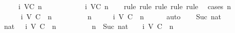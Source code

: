 \begin{isabellebody}
\ \ {\isachardoublequoteopen}{\isasymforall}\ {\isasymsigma}\ {\isasymsigma}{\isacharprime}{\isachardot}\ {\isasymsigma}{\isacharprime}\ {\isasymin}\ {\isasymSigma}i\ {\isacharparenleft}V{\isacharcomma}C{\isacharcomma}{\isasymepsilon}{\isacharparenright}\ n\ {\isasymlongrightarrow}\ {\isasymsigma}\ {\isasymsubseteq}\ {\isasymsigma}{\isacharprime}\ {\isasymlongrightarrow}\ {\isasymsigma}\ {\isasymin}\ {\isasymSigma}\ {\isasymlongrightarrow}\ {\isasymsigma}\ {\isasymin}\ {\isasymSigma}i\ {\isacharparenleft}V{\isacharcomma}C{\isacharcomma}{\isasymepsilon}{\isacharparenright}\ n{\isachardoublequoteclose}\isanewline
%
\isadelimproof
\ \ %
\endisadelimproof
%
\isatagproof
{}\isamarkupfalse%
\ {\isacharparenleft}rule{\isacharcomma}\ rule{\isacharcomma}\ rule{\isacharcomma}\ rule{\isacharcomma}\ rule{\isacharparenright}\ \isanewline
{}\isamarkupfalse%
\ {\isacharparenleft}cases\ n{\isacharparenright}\isanewline
\ \ \isamarkupfalse%
\ {}\isanewline
\ \ \isamarkupfalse%
\ {\isachardoublequoteopen}{\isasymAnd}{\isasymsigma}\ {\isasymsigma}{\isacharprime}{\isachardot}\ {\isasymsigma}{\isacharprime}\ {\isasymin}\ {\isasymSigma}i\ {\isacharparenleft}V{\isacharcomma}\ C{\isacharcomma}\ {\isasymepsilon}{\isacharparenright}\ n\ {\isasymLongrightarrow}\ {\isasymsigma}\ {\isasymsubseteq}\ {\isasymsigma}{\isacharprime}\ {\isasymLongrightarrow}\ {\isasymsigma}\ {\isasymin}\ {\isasymSigma}\ {\isasymLongrightarrow}\ n\ {\isacharequal}\ {}\ {\isasymLongrightarrow}\ {\isasymsigma}\ {\isasymin}\ {\isasymSigma}i\ {\isacharparenleft}V{\isacharcomma}\ C{\isacharcomma}\ {\isasymepsilon}{\isacharparenright}\ n{\isachardoublequoteclose}\isanewline
\ \ \ \ \isamarkupfalse%
\ auto\isanewline
{}\isamarkupfalse%
\isanewline
\ \ \isamarkupfalse%
\ {\isacharparenleft}Suc\ nat{\isacharparenright}\isanewline
\ \ \isamarkupfalse%
\ {\isachardoublequoteopen}{\isasymAnd}{\isasymsigma}\ {\isasymsigma}{\isacharprime}\ nat{\isachardot}\ {\isasymsigma}{\isacharprime}\ {\isasymin}\ {\isasymSigma}i\ {\isacharparenleft}V{\isacharcomma}\ C{\isacharcomma}\ {\isasymepsilon}{\isacharparenright}\ n\ {\isasymLongrightarrow}\ {\isasymsigma}\ {\isasymsubseteq}\ {\isasymsigma}{\isacharprime}\ {\isasymLongrightarrow}\ {\isasymsigma}\ {\isasymin}\ {\isasymSigma}\ {\isasymLongrightarrow}\ n\ {\isacharequal}\ Suc\ nat\ {\isasymLongrightarrow}\ {\isasymsigma}\ {\isasymin}\ {\isasymSigma}i\ {\isacharparenleft}V{\isacharcomma}\ C{\isacharcomma}\ {\isasymepsilon}{\isacharparenright}\ n{\isachardoublequoteclose}\isanewline

\end{isabellebody}
